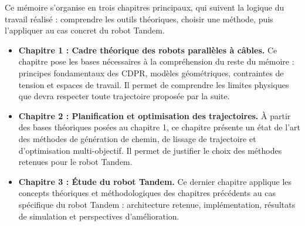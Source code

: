 Ce mémoire s'organise en trois chapitres principaux, qui suivent la logique du travail réalisé : comprendre les outils théoriques, choisir une méthode, puis l'appliquer au cas concret du robot Tandem.
\begin{itemize}
\item \textbf{Chapitre 1 : Cadre théorique des robots parallèles à câbles.} Ce chapitre pose les bases nécessaires à la compréhension du reste du mémoire : principes fondamentaux des CDPR, modèles géométriques, contraintes de tension et espaces de travail. Il permet de comprendre les limites physiques que devra respecter toute trajectoire proposée par la suite.
\item \textbf{Chapitre 2 : Planification et optimisation des trajectoires.} À partir des bases théoriques posées au chapitre 1, ce chapitre présente un état de l'art des méthodes de génération de chemin, de lissage de trajectoire et d'optimisation multi-objectif. Il permet de justifier le choix des méthodes retenues pour le robot Tandem.
\item \textbf{Chapitre 3 : Étude du robot Tandem.} Ce dernier chapitre applique les concepts théoriques et méthodologiques des chapitres précédents au cas spécifique du robot Tandem : architecture retenue, implémentation, résultats de simulation et perspectives d'amélioration.
\end{itemize}


